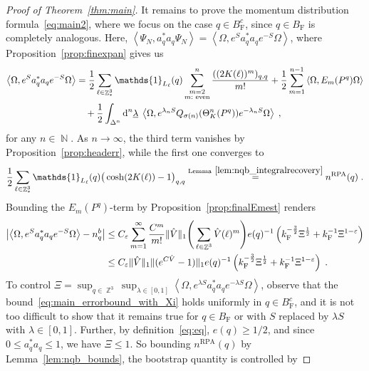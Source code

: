 \documentclass[12pt,a4paper]{article}
\numberwithin{equation}{section}
\newcommand{\1}{\mathbb{I}}
\newcommand{\di}{\textnormal{d}}
\newcommand{\F}{\mathrm{F}}
\newcommand{\RPA}{\mathrm{RPA}}
\DeclareMathOperator{\N}{\mathbb{N}}
\DeclareMathOperator{\Z}{\mathbb{Z}}
\newcommand{\half}{\frac{1}{2}}
\newcommand{\eva}[1]{\left\langle #1 \right\rangle}
\theoremstyle{plain}
\theoremstyle{definition}
\theoremstyle{remark}
\theoremstyle{plain}
\theoremstyle{definition}
\theoremstyle{remark}
\begin{document}
\begin{proof}[Proof of Theorem~\ref{thm:main}]
It remains to prove the momentum distribution formula~\eqref{eq:main2}, where we focus on the case $ q \in B_{\F}^c $, since $ q \in B_{\F} $ is completely analogous. Here, $ \eva{\Psi_N, a_q^* a_q \Psi_N} = \eva{\Omega, e^{S} a_q^* a_q e^{-S} \Omega} $, where Proposition~\ref{prop:finexpan} gives us
\begin{align*}
	\eva{\Omega, e^{S} a_q^* a_q e^{-S} \Omega} 
	&= \half\sum_{\ell\in \Z^3_*}\mathds{1}_{L_\ell}(q) \sum_{\substack{m=2\\m:\textnormal{ even}}}^n \frac{((2K(\ell))^m)_{q,q}}{m!}
		+ \half \sum_{m=1}^{n-1} \eva{\Omega, E_m(P^q)\Omega}\nonumber\\
	&\quad +\half \int_{\Delta^n} \di^n\underline{\lambda} \;
		\eva{\Omega, e^{\lambda_n S}Q_{\sigma(n)}(\Theta^n_{K}(P^q)) e^{-\lambda_n S} \Omega} \;,
\end{align*}
for any $ n \in \N $. As $ n \to \infty $, the third term vanishes by Proposition~\ref{prop:headerr}, while the first one converges to
\begin{equation*}
	\half\sum_{\ell\in \Z^3_*}\mathds{1}_{L_\ell}(q) \big( \cosh(2K(\ell)) - 1 \big)_{q,q}
	\overset{\textnormal{Lemma}~\ref{lem:nqb_integralrecovery}}{=} n^{\RPA}(q) \;.
\end{equation*}
Bounding the $ E_m(P^q) $-term by Proposition~\ref{prop:finalEmest} renders
\begin{equation} \label{eq:main_errorbound_with_Xi}
\begin{aligned}
	\abs{\eva{\Omega, e^{S} a_q^* a_q e^{-S} \Omega} - n_q^b}
	&\le C_\varepsilon \sum_{m=1}^\infty \frac{C^m}{m!} \Vert \hat{V} \Vert_1
		\Bigg( \sum_{\ell \in \Z^3} \hat{V}(\ell)^m \Bigg)
		e(q)^{-1} \left( k_{\F}^{-\frac{3}{2}} \Xi^\half
		+ k_{\F}^{-1}\Xi^{1-\varepsilon} \right) \\
	&\le C_\varepsilon \Vert \hat{V} \Vert_1 \Vert (e^{C \hat{V}}-1) \Vert_1
		e(q)^{-1} \left( k_{\F}^{-\frac{3}{2}} \Xi^\half
		+ k_{\F}^{-1}\Xi^{1-\varepsilon} \right) \;.
\end{aligned}
\end{equation}
To control $ \Xi = \sup_{q \in \Z^3} \sup_{\lambda \in [0,1]} \eva{\Omega, e^{\lambda S} a_q^* a_q e^{- \lambda S} \Omega} $, observe that the bound~\eqref{eq:main_errorbound_with_Xi} holds uniformly in $ q \in B_{\F}^c $, and it is not too difficult to show that it remains true for $ q \in B_{\F} $ or with $ S $ replaced by $ \lambda S $ with $ \lambda \in [0,1] $. Further, by definition~\eqref{eq:eq}, $ e(q) \ge 1/2 $, and since $ 0 \le a_q^* a_q \le 1 $, we have $ \Xi \le 1 $. So bounding $ n^{\RPA}(q) $ by Lemma~\ref{lem:nqb_bounds}, the bootstrap quantity is controlled by

\end{proof}
\end{document}
